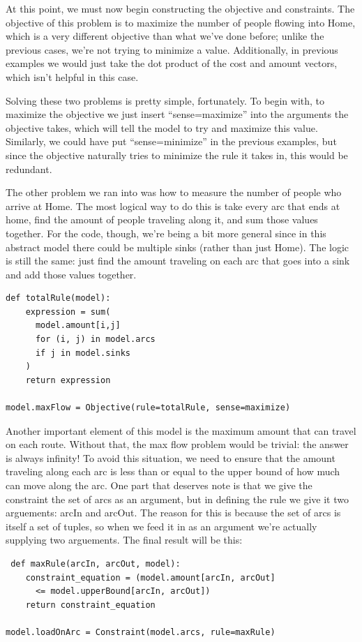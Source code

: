 \documentclass{article}
\begin{document}
At this point, we must now begin constructing the objective and constraints.  The objective of this problem is to maximize the number of people flowing into Home, which is a very different objective than what we've done before; unlike the previous cases, we're not trying to minimize a value.  Additionally, in previous examples we would just take the dot product of the cost and amount vectors, which isn't helpful in this case.

Solving these two problems is pretty simple, fortunately.  To begin with, to maximize the objective we just insert ``sense=maximize'' into the arguments the objective takes, which will tell the model to try and maximize this value.  Similarly, we could have put ``sense=minimize'' in the previous examples, but since the objective naturally tries to minimize the rule it takes in, this would be redundant.

The other problem we ran into was how to measure the number of people who arrive at Home.  The most logical way to do this is take every arc that ends at home, find the amount of people traveling along it, and sum those values together.  For the code, though, we're being a bit more general since in this abstract model there could be multiple sinks (rather than just Home).  The logic is still the same: just find the amount traveling on each arc that goes into a sink and add those values together.

\begin{verbatim}
def totalRule(model):
    expression = sum(
      model.amount[i,j]
      for (i, j) in model.arcs
      if j in model.sinks
    )
    return expression

model.maxFlow = Objective(rule=totalRule, sense=maximize)
\end{verbatim}

Another important element of this model is the maximum amount that can travel on each route.  Without that, the max flow problem would be trivial: the answer is always infinity!  To avoid this situation, we need to ensure that the amount traveling along each arc is less than or equal to the upper bound of how much can move along the arc.  One part that deserves note is that we give the constraint the set of arcs as an argument, but in defining the rule we give it two arguements: arcIn and arcOut.  The reason for this is because the set of arcs is itself a set of tuples, so when we feed it in as an argument we're actually supplying two arguements.  The final result will be this:

\begin{verbatim}
 def maxRule(arcIn, arcOut, model):
    constraint_equation = (model.amount[arcIn, arcOut] 
      <= model.upperBound[arcIn, arcOut])
    return constraint_equation

model.loadOnArc = Constraint(model.arcs, rule=maxRule)
\end{verbatim}
\end{document}
